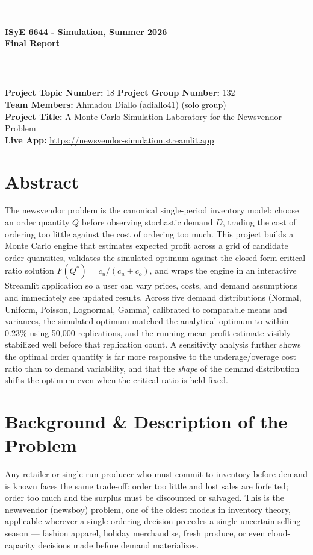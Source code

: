 \documentclass[11pt]{article}
\begin{document}
\thispagestyle{empty}

\begin{center}
	\rule{\linewidth}{1mm} \\[0.2cm]
	{ \Large \bfseries ISyE 6644 - Simulation, Summer 2026 \\[0.1cm]
		Final Report}\\[0.2cm]
	\rule{\linewidth}{1mm} \\[0.15cm]
\end{center}

\noindent\textbf{Project Topic Number:} 18 \quad
\textbf{Project Group Number:} 132 \\
\textbf{Team Members:} Ahmadou Diallo (adiallo41) (solo group) \\
\textbf{Project Title:} A Monte Carlo Simulation Laboratory for the Newsvendor Problem \\
\textbf{Live App:} \url{https://newsvendor-simulation.streamlit.app}

\section*{Abstract}
The newsvendor problem is the canonical single-period inventory model: choose an order quantity
$Q$ before observing stochastic demand $D$, trading the cost of ordering too little against the
cost of ordering too much. This project builds a Monte Carlo engine that estimates expected
profit across a grid of candidate order quantities, validates the simulated optimum against the
closed-form critical-ratio solution $F(Q^*) = c_u/(c_u+c_o)$, and wraps the engine in an
interactive Streamlit application so a user can vary prices, costs, and demand assumptions and
immediately see updated results. Across five demand distributions (Normal, Uniform, Poisson,
Lognormal, Gamma) calibrated to comparable means and variances, the simulated optimum matched the
analytical optimum to within 0.23\% using 50{,}000 replications, and the running-mean profit
estimate visibly stabilized well before that replication count. A sensitivity analysis further
shows the optimal order quantity is far more responsive to the underage/overage cost ratio than
to demand variability, and that the \emph{shape} of the demand distribution shifts the optimum
even when the critical ratio is held fixed.

\section*{Background \& Description of the Problem}
Any retailer or single-run producer who must commit to inventory before demand is known faces the
same trade-off: order too little and lost sales are forfeited; order too much and the surplus
must be discounted or salvaged. This is the newsvendor (newsboy) problem, one of the oldest models
in inventory theory, applicable wherever a single ordering decision precedes a single uncertain
selling season --- fashion apparel, holiday merchandise, fresh produce, or even cloud-capacity
decisions made before demand materializes.
\end{document}
